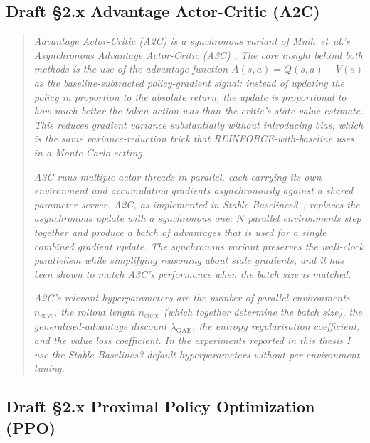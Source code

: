 \documentclass[11pt,a4paper]{article}
\begin{document}
\subsection*{Draft §2.x Advantage Actor-Critic (A2C)}

\begin{quote}
\textit{Advantage Actor-Critic (A2C) is a synchronous variant of
Mnih~et~al.'s Asynchronous Advantage Actor-Critic (A3C)
\cite{mnih2016a3c}. The core insight behind both methods is the use of
the advantage function
$A(s,a) = Q(s,a) - V(s)$
as the baseline-subtracted policy-gradient signal: instead of updating
the policy in proportion to the absolute return, the update is
proportional to how much better the taken action was than the critic's
state-value estimate. This reduces gradient variance substantially
without introducing bias, which is the same variance-reduction trick
that REINFORCE-with-baseline uses in a Monte-Carlo setting.}

\textit{A3C runs multiple actor threads in parallel, each carrying its
own environment and accumulating gradients asynchronously against a
shared parameter server. A2C, as implemented in
Stable-Baselines3~\cite{raffin2021sb3}, replaces the asynchronous update
with a synchronous one: $N$ parallel environments step together and
produce a batch of advantages that is used for a single combined
gradient update. The synchronous variant preserves the wall-clock
parallelism while simplifying reasoning about stale gradients, and it
has been shown to match A3C's performance when the batch size is
matched.}

\textit{A2C's relevant hyperparameters are the number of parallel
environments $n_{\text{envs}}$, the rollout length $n_{\text{steps}}$
(which together determine the batch size), the generalised-advantage
discount $\lambda_{\text{GAE}}$, the entropy regularisation
coefficient, and the value loss coefficient. In the experiments
reported in this thesis I use the Stable-Baselines3 default
hyperparameters without per-environment tuning.}
\end{quote}

\subsection*{Draft §2.x Proximal Policy Optimization (PPO)}
\end{document}
